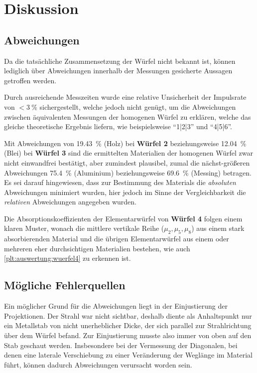 \section{Diskussion}
\label{sec:diskussion}

\subsection{Abweichungen}
    Da die tatsächliche Zusammensetzung der Würfel nicht bekannt ist,
    können lediglich über Abweichungen innerhalb der Messungen gesicherte Aussagen getroffen werden.

    Durch ausreichende Messzeiten wurde
    eine relative Unsicherheit der Impulsrate von $< \SI{3}{\percent}$ sichergestellt,
    welche jedoch nicht genügt,
    um die Abweichungen zwischen äquivalenten Messungen der homogenen Würfel zu erklären,
    welche das gleiche theoretische Ergebnis liefern,
    wie beispielsweise \enquote{1|2|3} und \enquote{4|5|6}.

    Mit Abweichungen von
    \SI{19.43}{\percent} (Holz) bei \textbf{Würfel 2} beziehungsweise
    \SI{12.04}{\percent} (Blei) bei \textbf{Würfel 3}
    sind die ermittelten Materialien der homogenen Würfel zwar nicht einwandfrei bestätigt,
    aber zumindest plausibel,
    zumal die nächst-größeren Abweichungen
    \SI{75.4}{\percent} (Aluminium) beziehungsweise
    \SI{69.6}{\percent} (Messing)
    betragen.
    Es sei darauf hingewiesen, dass zur Bestimmung des Materials die \emph{absoluten} Abweichungen minimiert wurden,
    hier jedoch im Sinne der Vergleichbarkeit die \emph{relativen} Abweichungen angegeben wurden.

    Die Absorptionskoeffizienten der Elementarwürfel von \textbf{Würfel 4} folgen einem klaren Muster,
    wonach die mittlere vertikale Reihe ($\mu_2, \mu_5, \mu_8$) aus einem stark absorbierenden Material
    und die übrigen Elementarwürfel aus einem oder mehreren eher durchsichtigen Materialien bestehen,
    wie auch \autoref{plt:auswertung:wuerfel4} zu erkennen ist.


\subsection{Mögliche Fehlerquellen}

    Ein möglicher Grund für die Abweichungen liegt in der Einjustierung der Projektionen.
    Der Strahl war nicht sichtbar,
    deshalb diente als Anhaltspunkt nur ein Metallstab von nicht unerheblicher Dicke,
    der sich parallel zur Strahlrichtung über dem Würfel befand.
    Zur Einjustierung musste also immer von oben auf den Stab geschaut werden.
    Insbesondere bei der Vermessung der Diagonalen,
    bei denen eine laterale Verschiebung zu einer Veränderung der Weglänge im Material führt,
    können dadurch Abweichungen verursacht worden sein.

